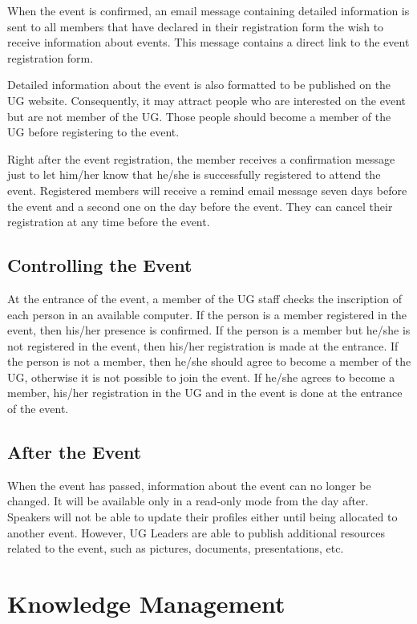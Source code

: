 \documentclass[envcountsame,envcountchap]{svmono}
\begin{document}
When the event is confirmed, an email message containing detailed information is sent to all members that have declared in their registration form the wish to receive information about events. This message contains a direct link to the event registration form.

Detailed information about the event is also formatted to be published on the UG website. Consequently, it may attract people who are interested on the event but are not member of the UG. Those people should become a member of the UG before registering to the event.

Right after the event registration, the member receives a confirmation message just to let him/her know that he/she is successfully registered to attend the event. Registered members will receive a remind email message seven days before the event and a second one on the day before the event. They can cancel their registration at any time before the event.

\section{Controlling the Event}

At the entrance of the event, a member of the UG staff checks the inscription of each person in an available computer. If the person is a member registered in the event, then his/her presence is confirmed. If the person is a member but he/she is not registered in the event, then his/her registration is made at the entrance. If the person is not a member, then he/she should agree to become a member of the UG, otherwise it is not possible to join the event. If he/she agrees to become a member, his/her registration in the UG and in the event is done at the entrance of the event.

\section{After the Event}

When the event has passed, information about the event can no longer be changed. It will be available only in a read-only mode from the day after. Speakers will not be able to update their profiles either until being allocated to another event. However, UG Leaders are able to publish additional resources related to the event, such as pictures, documents, presentations, etc.

\chapter{Knowledge Management}
\end{document}
